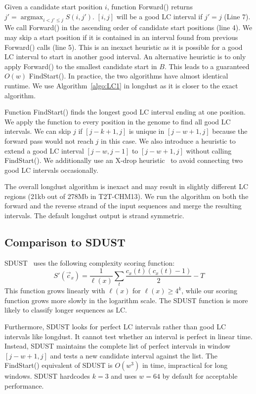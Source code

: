 \documentclass[webpdf,contemporary,large,namedate]{oup-authoring-template}%
\DeclareMathOperator*{\argmax}{argmax}
\begin{document}
Given a candidate start position $i$,
function {\sc Forward}() returns $j'=\argmax_{i<j'\le j} S(i,j')$.
$[i,j]$ will be a good LC interval if $j'=j$ (Line 7).
We call {\sc Forward}() in the ascending order of candidate start positions (line 4).
We may skip a start position if it is contained in an interval found from previous {\sc Forward}() calls (line 5).
This is an inexact heuristic as it is possible for a good LC interval to start in another good interval.
An alternative heuristic is to only apply {\sc Forward}() to the smallest candidate start in $B$.
This leads to a guaranteed $O(w)$ {\sc FindStart}().
In practice, the two algorithms have almost identical runtime.
We use Algorithm~\ref{algo:LC1} in longdust as it is closer to the exact algorithm.

Function {\sc FindStart}() finds the longest good LC interval ending at one position.
We apply the function to every position in the genome to find all good LC intervals.
We can skip $j$ if $[j-k+1,j]$ is unique in $[j-w+1,j]$ because the forward pass would not reach $j$ in this case.
We also introduce a heuristic to extend a good LC interval $[j-w,j-1]$ to $[j-w+1,j]$ without calling {\sc FindStart}().
We additionally use an X-drop heuristic~\citep{Altschul:1997vn} to avoid connecting two good LC intervals occasionally.

The overall longdust algorithm is inexact and may result in slightly different LC regions (21kb out of 278Mb in T2T-CHM13).
We run the algorithm on both the forward and the reverse strand of the input sequences and merge the resulting intervals.
The default longdust output is strand symmetric.

\subsection{Comparison to SDUST}

SDUST~\citep{Morgulis:2006aa} uses the following complexity scoring function:
$$
S'(\vec{c}_x)=\frac{1}{\ell(x)}\sum_t\frac{c_x(t)(c_x(t)-1)}{2}-T
$$
This function grows linearly with $\ell(x)$ for $\ell(x)\ge4^k$,
while our scoring function grows more slowly in the logarithm scale.
The SDUST function is more likely to classify longer sequences as LC.

Furthermore, SDUST looks for perfect LC intervals rather than good LC intervals like longdust.
It cannot test whether an interval is perfect in linear time.
Instead, SDUST maintains the complete list of perfect intervals in window $[j-w+1,j]$
and tests a new candidate interval against the list.
The {\sc FindStart}() equivalent of SDUST is $O(w^3)$ in time, impractical for long windows.
SDUST hardcodes $k=3$ and uses $w=64$ by default for acceptable performance.
\end{document}
